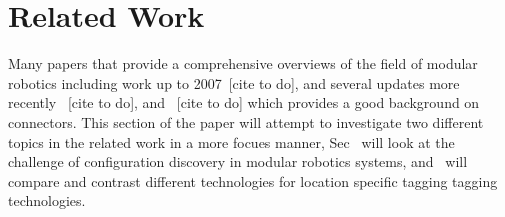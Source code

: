 
\section{Related Work}
\label{sec:RelatedWork}

Many papers that provide a comprehensive overviews of the field of modular robotics including work up to 2007~[cite to do], and several updates more recently ~[cite to do], and ~[cite to do] which provides a good background on connectors. This section of the paper will attempt to investigate two different topics in the related work in a more focues manner, Sec~\label{sec:RWconfiguration} will look at the challenge of configuration discovery in modular robotics systems, and~\label{sec:RWtaggingTech} will compare and contrast different technologies for location specific tagging tagging technologies.

